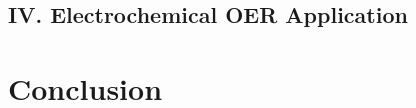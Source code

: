 \documentclass[%
  journal=cmatex,
  manuscript=article,
  ]{achemso}
\begin{document}
  \subsection{IV. Electrochemical OER Application}
  

\section{Conclusion}


\begin{acknowledgement}

\end{acknowledgement}



\clearpage
\renewcommand{\thefigure}{S\arabic{figure}}
\setcounter{figure}{0}
\renewcommand{\thetable}{S\arabic{table}}
\setcounter{table}{0}

\begin{suppinfo}

\end{suppinfo}


\end{document}
